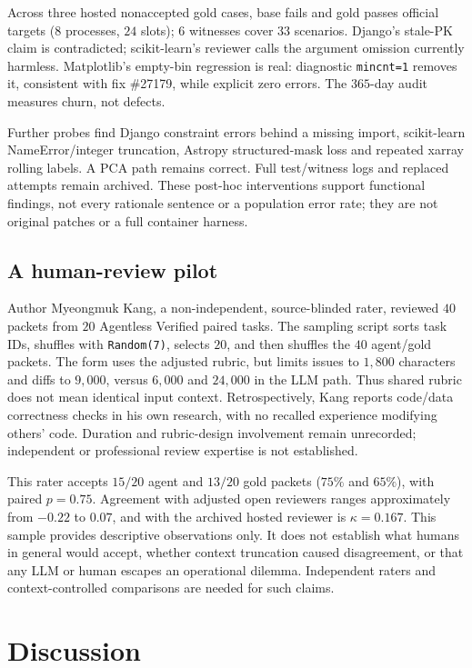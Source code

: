 \documentclass[10pt,conference]{IEEEtran}
\begin{document}
Across three hosted nonaccepted gold cases, base fails and gold passes official targets
($8$ processes, $24$ slots); $6$ witnesses cover $33$ scenarios. Django's stale-PK claim
is contradicted; scikit-learn's reviewer calls the argument omission currently harmless.
Matplotlib's empty-bin regression is real: diagnostic \texttt{mincnt=1} removes it,
consistent with fix \#27179, while explicit zero errors. The $365$-day audit measures
churn, not defects.

Further probes find Django constraint errors behind a missing import, scikit-learn
NameError/integer truncation, Astropy structured-mask loss and repeated xarray rolling
labels. A PCA path remains correct. Full test/witness logs and replaced attempts remain
archived. These post-hoc interventions support functional findings, not every rationale
sentence or a population error rate; they are not original patches or a full container harness.

\subsection{A human-review pilot}
Author Myeongmuk Kang, a non-independent, source-blinded rater, reviewed $40$ packets from
$20$ Agentless Verified paired tasks. The sampling script sorts task IDs, shuffles with \texttt{Random(7)}, selects
$20$, and then shuffles the $40$ agent/gold packets. The form uses the adjusted rubric,
but limits issues to $1{,}800$ characters and diffs to $9{,}000$, versus $6{,}000$ and
$24{,}000$ in the LLM path. Thus shared rubric does not mean identical input context.
Retrospectively, Kang reports code/data correctness checks in his own research, with no
recalled experience modifying others' code. Duration and rubric-design involvement remain
unrecorded; independent or professional review expertise is not established.

This rater accepts $15/20$ agent and $13/20$ gold packets ($75\%$ and $65\%$), with
paired $p=0.75$. Agreement with adjusted open reviewers ranges approximately from
$-0.22$ to $0.07$, and with the archived hosted reviewer is $\kappa=0.167$. This sample
provides descriptive observations only. It does not establish what humans in general would
accept, whether context truncation caused disagreement, or that any LLM or human escapes
an operational dilemma. Independent raters and context-controlled comparisons are needed
for such claims.

\section{Discussion}
\label{sec:discussion}
\end{document}

